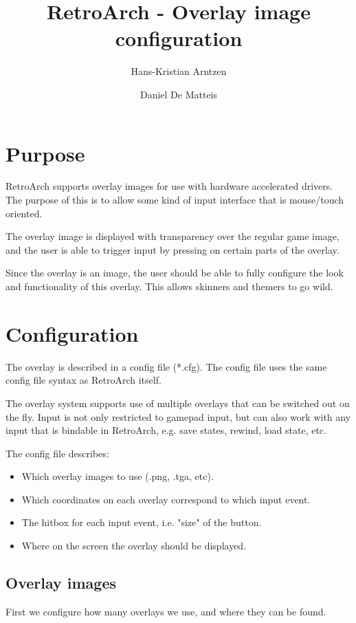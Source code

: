 \documentclass[a4paper, 11pt]{article}
\title{RetroArch - Overlay image configuration}
\author{
Hans-Kristian Arntzen
\and
Daniel De Matteis}
\begin{document}
\maketitle

\section*{Purpose}

RetroArch supports overlay images for use with hardware accelerated drivers.
The purpose of this is to allow some kind of input interface that is mouse/touch oriented.

The overlay image is displayed with transparency over the regular game image, and the user is able to trigger input by pressing on certain parts of the overlay.

Since the overlay is an image, the user should be able to fully configure the look and functionality of this overlay. This allows skinners and themers to go wild.

\section*{Configuration}

The overlay is described in a config file (*.cfg). The config file uses the same config file syntax as RetroArch itself.

The overlay system supports use of multiple overlays that can be switched out on the fly. Input is not only restricted to gamepad input, but can also work with any input that is bindable in RetroArch, e.g. save states, rewind, load state, etc.

The config file describes:
\begin{itemize}
  \item Which overlay images to use (.png, .tga, etc).
  \item Which coordinates on each overlay correspond to which input event.
  \item The hitbox for each input event, i.e. "size" of the button.
  \item Where on the screen the overlay should be displayed.
\end{itemize}


\subsection*{Overlay images}

First we configure how many overlays we use, and where they can be found.
\end{document}
